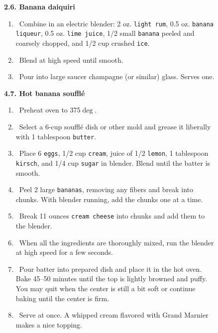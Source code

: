 \begin{figure}
{\large\bf 2.6.  Banana daiquiri}

\begin{enumerate}
\item\ {Combine in an electric blender: 2 oz. {\tt light rum},
     0.5 oz. {\tt banana liqueur}, 0.5 oz. {\tt lime juice}, 1/2
     small {\tt banana} peeled and coarsely chopped, and 1/2 cup
     crushed {\tt ice}.}\vspace{-5pt}
\item\ {Blend at high speed until smooth.}\vspace{-5pt}
\item\ {Pour into large saucer champagne (or similar) glass.  Serves
     one.}
\end{enumerate}

\vspace{6pt}
{\large\bf 4.7.  Hot banana souffl\'e}

\begin{enumerate}
\item\ {Preheat oven to 375$\deg$.}\vspace{-5pt}
\item\ {Select a 6-cup souffl\'e dish or other mold and grease it
     liberally with 1 tablespoon {\tt butter}.}\vspace{-5pt}
\item\ {Place 6 {\tt eggs}, 1/2 cup {\tt cream}, juice of 1/2
     {\tt lemon}, 1 tablespoon {\tt kirsch}, and 1/4 cup {\tt sugar}
     in blender. Blend until the batter is smooth.}\vspace{-5pt}
\item\ {Peel 2 large {\tt bananas}, removing any fibers and
     break into chunks.  With blender running, add the chunks one at a
     time.}\vspace{-5pt}
\item\ {Break 11 ounces {\tt cream cheese} into chunks and add them
     to the blender.}\vspace{-5pt}
\item\ {When all the ingredients are thoroughly mixed, run the
     blender at high speed for a few seconds.}\vspace{-5pt}
\item\ {Pour batter into prepared dish and place it in the hot
     oven.  Bake 45--50 minutes until the top is lightly browned and
     puffy.  You may quit when the center is still a bit soft or
     continue baking until the center is firm.}\vspace{-5pt}
\item\ {Serve at once.  A whipped cream flavored with Grand
     Marnier makes a nice topping.}
\end{enumerate}


\end{figure}
